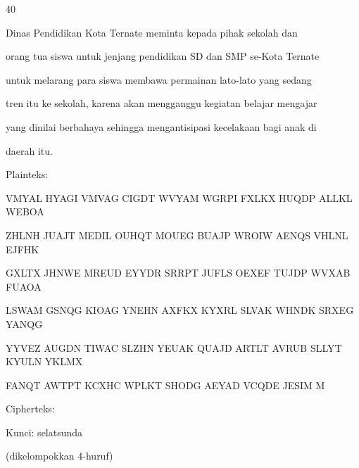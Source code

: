 \documentclass{article}
\begin{document}

40

Dinas Pendidikan Kota Ternate meminta kepada pihak sekolah dan 

orang tua siswa untuk jenjang pendidikan SD dan SMP se-Kota Ternate 

untuk melarang para siswa membawa permainan lato-lato yang sedang 

tren itu ke sekolah, karena akan mengganggu kegiatan belajar mengajar 

yang dinilai berbahaya sehingga mengantisipasi kecelakaan bagi anak di 

daerah itu.

Plainteks:

VMYAL HYAGI VMVAG CIGDT WVYAM WGRPI FXLKX HUQDP ALLKL WEBOA 

ZHLNH JUAJT MEDIL OUHQT MOUEG BUAJP WROIW AENQS VHLNL EJFHK 

GXLTX JHNWE MREUD EYYDR SRRPT JUFLS OEXEF TUJDP WVXAB FUAOA 

LSWAM GSNQG KIOAG YNEHN AXFKX KYXRL SLVAK WHNDK SRXEG YANQG 

YYVEZ AUGDN TIWAC SLZHN YEUAK QUAJD ARTLT AVRUB SLLYT KYULN YKLMX 

FANQT AWTPT KCXHC WPLKT SHODG AEYAD VCQDE JESIM M

Cipherteks:

Kunci:         selatsunda 

(dikelompokkan 4-huruf)
\end{document}
